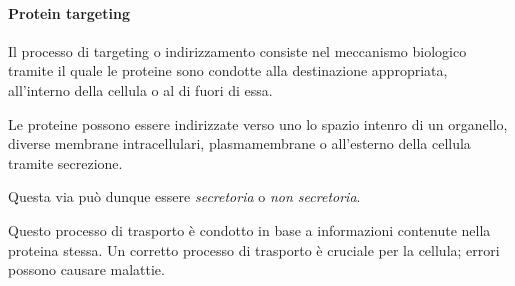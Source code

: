 \documentclass[11pt]{book}
\begin{document}
\paragraph{Protein targeting}\label{protein-targeting}

Il processo di targeting o indirizzamento consiste nel meccanismo
biologico tramite il quale le proteine sono condotte alla destinazione
appropriata, all'interno della cellula o al di fuori di essa.

Le proteine possono essere indirizzate verso uno lo spazio intenro di un
organello, diverse membrane intracellulari, plasmamembrane o all'esterno
della cellula tramite secrezione.

Questa via può dunque essere \emph{secretoria} o \emph{non secretoria}.

Questo processo di trasporto è condotto in base a informazioni contenute
nella proteina stessa. Un corretto processo di trasporto è cruciale per
la cellula; errori possono causare malattie.
\end{document}
